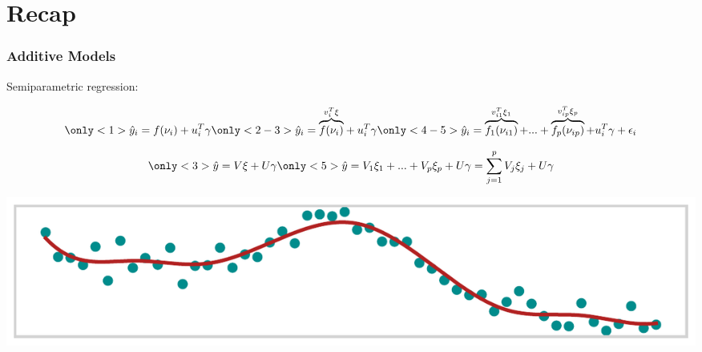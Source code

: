 \documentclass[final]{beamer}
\newcommand{\inserteqstrut}[1]{%
  \rlap{$\displaystyle#1$}%
  \phantom{\biggesteq}}
\begin{document}
\section{Recap}

\renewcommand{\biggesteq}{\overbrace{f(\nu_{i})}^{v^T_{i}\xi_1}}
\begin{frame}[b]
\frametitle{Additive Models}

Semiparametric regression:

\begin{minipage}[b][4em][b]{\textwidth}
\begin{overprint}
\begin{align*}
\only<1>{
\hat{y}_i = \inserteqstrut{f(\nu_{i})} + u^T_i \gamma
}
\only<2-3>{
\hat{y}_i = \inserteqstrut{\overbrace{f(\nu_{i})}^{v^T_{i}\xi}} + u^T_i \gamma
}
\only<4-5>{
\hat{y}_i = \overbrace{f_1(\nu_{i1})}^{v^T_{i1}\xi_1} + ... + \overbrace{f_p(\nu_{ip})}^{v^T_{ip}\xi_p} + u^T_i \gamma
}
+\epsilon_i
\end{align*}
\end{overprint}
\vspace{-2.5em}
\end{minipage}

\begin{minipage}[t][0em][t]{\textwidth}
\vspace{-0.5em}
\end{minipage}

\begin{minipage}[b][4em][b]{\textwidth}
\begin{overprint}
\begin{align*}
\only<3>{
\hat{y} = V\xi + U\gamma
}
\only<5>{
\hat{y} = V_1\xi_1 + ... + V_p \xi_p + U\gamma =\sum_{j=1}^p V_j\xi_j + U\gamma
}
\end{align*}
\end{overprint}
\vspace{-3em}
\end{minipage}


\begin{center}
\includegraphics[width=\textwidth]{Images/flex}
\end{center}

\end{frame}
\end{document}
